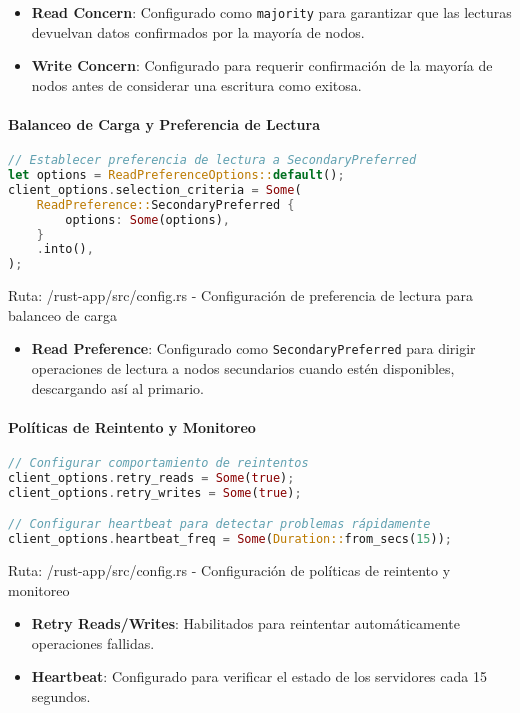\documentclass[12pt,letterpaper]{article}
\begin{document}
\begin{itemize}
    \item \textbf{Read Concern}: Configurado como \texttt{majority} para garantizar que las lecturas devuelvan datos confirmados por la mayoría de nodos.
    \item \textbf{Write Concern}: Configurado para requerir confirmación de la mayoría de nodos antes de considerar una escritura como exitosa.
\end{itemize}

\paragraph{Balanceo de Carga y Preferencia de Lectura}
\begin{lstlisting}[language=rust]
// Establecer preferencia de lectura a SecondaryPreferred
let options = ReadPreferenceOptions::default();
client_options.selection_criteria = Some(
    ReadPreference::SecondaryPreferred {
        options: Some(options),
    }
    .into(),
);
\end{lstlisting}
\small{Ruta: /rust-app/src/config.rs - Configuración de preferencia de lectura para balanceo de carga}

\begin{itemize}
    \item \textbf{Read Preference}: Configurado como \texttt{SecondaryPreferred} para dirigir operaciones de lectura a nodos secundarios cuando estén disponibles, descargando así al primario.
\end{itemize}

\paragraph{Políticas de Reintento y Monitoreo}
\begin{lstlisting}[language=rust]
// Configurar comportamiento de reintentos
client_options.retry_reads = Some(true);
client_options.retry_writes = Some(true);

// Configurar heartbeat para detectar problemas rápidamente
client_options.heartbeat_freq = Some(Duration::from_secs(15));
\end{lstlisting}
\small{Ruta: /rust-app/src/config.rs - Configuración de políticas de reintento y monitoreo}

\begin{itemize}
    \item \textbf{Retry Reads/Writes}: Habilitados para reintentar automáticamente operaciones fallidas.
    \item \textbf{Heartbeat}: Configurado para verificar el estado de los servidores cada 15 segundos.
\end{itemize}
\end{document}
